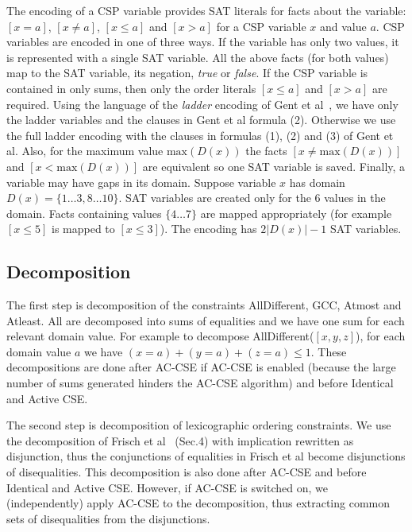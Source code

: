 \documentclass[a4paper]{article}
\begin{document}
The encoding of a CSP variable provides SAT literals for facts about the variable: $[x=a]$, $[x\ne a]$, $[x\le a]$ and $[x>a]$ for a CSP variable $x$ and value $a$.
CSP variables are encoded in one of three ways. If the variable has only two values, it is represented with a single SAT variable. All the above facts (for both values) map to the SAT variable, its negation, \textit{true} or \textit{false}. If the CSP variable is contained in only sums, then only the order literals $[x\le a]$ and $[x>a]$ are required. Using the language of the \textit{ladder} encoding of Gent et al~\cite{GentIP:alldiff-to-sat}, we have only the ladder variables and the clauses in Gent et al formula (2). Otherwise we use the full ladder encoding with the clauses in formulas (1), (2) and (3) of Gent et al. Also, for the maximum value $\mathrm{max}(D(x))$ the facts $[x\ne \mathrm{max}(D(x))]$ and $[x<\mathrm{max}(D(x))]$ are equivalent so one SAT variable is saved. Finally, a variable may have gaps in its domain. Suppose variable $x$ has domain $D(x)=\{1\ldots 3, 8\ldots 10\}$. SAT variables are created only for the 6 values in the domain. Facts containing values $\{4\ldots 7\}$ are mapped appropriately (for example $[x\le 5]$ is mapped to $[x\le 3]$).
The encoding has $2|D(x)|-1$ SAT variables.

\subsection{Decomposition}

The first step is decomposition of the constraints AllDifferent, GCC, Atmost and  Atleast. All are decomposed into sums of equalities and we have one sum for each relevant domain value. For example to decompose AllDifferent($[x,y,z]$), for each domain value $a$ we have $(x=a)+(y=a)+(z=a)\le 1$.  These decompositions are done after AC-CSE if AC-CSE is enabled (because the large number of sums generated hinders the AC-CSE algorithm) and before Identical and Active CSE. 

The second step is decomposition of lexicographic ordering constraints. We use the decomposition of Frisch et al~\cite{frisch:GACLex} (Sec.4) with implication rewritten as disjunction, thus the conjunctions of equalities in Frisch et al become disjunctions of disequalities. This decomposition is also done after AC-CSE and before Identical and Active CSE. However, if AC-CSE is switched on, we (independently) apply AC-CSE to the decomposition, thus extracting common sets of disequalities from the disjunctions. 
\end{document}
